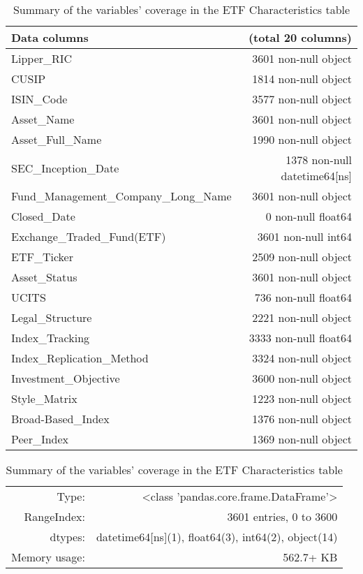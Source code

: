 \begin{table}[htbp]
\centering
  \label{tab:ETFCharacteristics}
  \caption{Summary of the variables' coverage in the ETF Characteristics table}
  \begin{tabular}{lr}
    \toprule
    Data columns & (total 20 columns)\\
    \midrule
    Lipper\_RIC & 3601 non-null object\\
    CUSIP & 1814 non-null object\\
    ISIN\_Code & 3577 non-null object\\
    Asset\_Name & 3601 non-null object\\
    Asset\_Full\_Name & 1990 non-null object\\
    SEC\_Inception\_Date & 1378 non-null datetime64[ns]\\
    Fund\_Management\_Company\_Long\_Name & 3601 non-null object\\
    Closed\_Date & 0 non-null float64\\
    Exchange\_Traded\_Fund(ETF) & 3601 non-null int64\\
    ETF\_Ticker & 2509 non-null object\\
    Asset\_Status & 3601 non-null object\\
    UCITS & 736 non-null float64\\
    Legal\_Structure & 2221 non-null object\\
    Index\_Tracking & 3333 non-null float64\\
    Index\_Replication\_Method & 3324 non-null object\\
    Investment\_Objective & 3600 non-null object\\
    Style\_Matrix & 1223 non-null object\\
    Broad-Based\_Index & 1376 non-null object\\
    Peer\_Index & 1369 non-null object\\
    \bottomrule
  \end{tabular}
  {\itshape
  \begin{tabular}{rr}
  Type: & <class 'pandas.core.frame.DataFrame'>\\
  RangeIndex: & 3601 entries, 0 to 3600\\
  dtypes: & datetime64[ns](1), float64(3), int64(2), object(14)\\
  Memory usage: & 562.7+ KB
  \end{tabular}}
\end{table}
